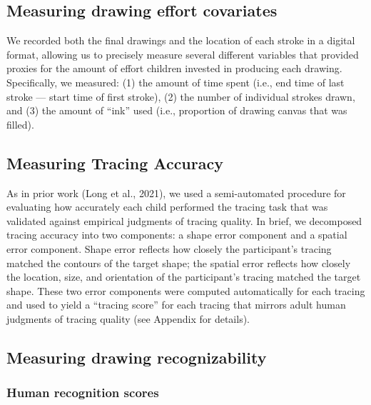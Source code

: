 \documentclass[
  man]{apa6}
\begin{document}
\hypertarget{measuring-drawing-effort-covariates}{%
\subsection{Measuring drawing effort covariates}\label{measuring-drawing-effort-covariates}}

We recorded both the final drawings and the location of each stroke in a digital format, allowing us to precisely measure several different variables that provided proxies for the amount of effort children invested in producing each drawing.
Specifically, we measured: (1) the amount of time spent (i.e., end time of last stroke --- start time of first stroke), (2) the number of individual strokes drawn, and (3) the amount of ``ink'' used (i.e., proportion of drawing canvas that was filled).

\hypertarget{measuring-tracing-accuracy}{%
\subsection{Measuring Tracing Accuracy}\label{measuring-tracing-accuracy}}

As in prior work (Long et al., 2021), we used a semi-automated procedure for evaluating how accurately each child performed the tracing task that was validated against empirical judgments of tracing quality. In brief, we decomposed tracing accuracy into two components: a shape error component and a spatial error component. Shape error reflects how closely the participant's tracing matched the contours of the target shape; the spatial error reflects how closely the location, size, and orientation of the participant's tracing matched the target shape. These two error components were computed automatically for each tracing and used to yield a ``tracing score'' for each tracing that mirrors adult human judgments of tracing quality (see Appendix for details).

\hypertarget{measuring-drawing-recognizability}{%
\subsection{Measuring drawing recognizability}\label{measuring-drawing-recognizability}}

\hypertarget{human-recognition-scores}{%
\subsubsection{Human recognition scores}\label{human-recognition-scores}}
\end{document}
